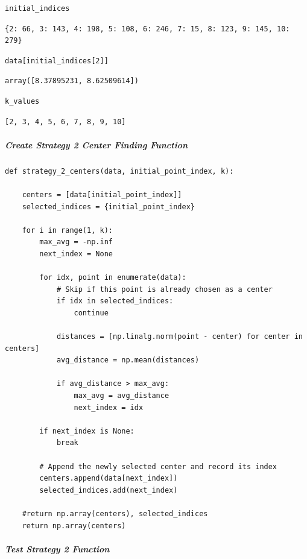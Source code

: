 \begin{verbatim}
initial_indices
\end{verbatim}

\begin{verbatim}
{2: 66, 3: 143, 4: 198, 5: 108, 6: 246, 7: 15, 8: 123, 9: 145, 10: 279}
\end{verbatim}

\begin{verbatim}
data[initial_indices[2]]
\end{verbatim}

\begin{verbatim}
array([8.37895231, 8.62509614])
\end{verbatim}

\begin{verbatim}
k_values
\end{verbatim}

\begin{verbatim}
[2, 3, 4, 5, 6, 7, 8, 9, 10]
\end{verbatim}

\subparagraph{Create Strategy 2 Center Finding Function}

\begin{verbatim}
def strategy_2_centers(data, initial_point_index, k):

    centers = [data[initial_point_index]]
    selected_indices = {initial_point_index}

    for i in range(1, k):
        max_avg = -np.inf
        next_index = None

        for idx, point in enumerate(data):
            # Skip if this point is already chosen as a center
            if idx in selected_indices:
                continue

            distances = [np.linalg.norm(point - center) for center in centers]
            avg_distance = np.mean(distances)

            if avg_distance > max_avg:
                max_avg = avg_distance
                next_index = idx

        if next_index is None:
            break

        # Append the newly selected center and record its index
        centers.append(data[next_index])
        selected_indices.add(next_index)

    #return np.array(centers), selected_indices
    return np.array(centers)
\end{verbatim}

\subparagraph{Test Strategy 2 Function}

